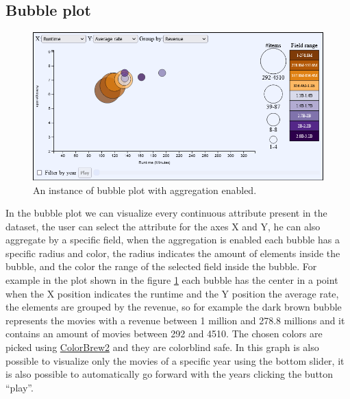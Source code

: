 \documentclass[]{article}
\newcommand{\quotes}[1]{``#1''}
\begin{document}
\subsection{Bubble plot}
\begin{figure}[H]
	\centering
	\includegraphics[width=1\linewidth]{images/bubble_plot}
	\caption[Bubble plot]{An instance of bubble plot with aggregation enabled.}
	\label{fig:bubbleplot}
\end{figure}
In the bubble plot we can visualize every continuous attribute present in the dataset, the user can select the attribute for the axes X and Y, he can also aggregate by a specific field, when the aggregation is enabled each bubble has a specific radius and color, the radius indicates the amount of elements inside the bubble, and the color the range of the selected field inside the bubble.
For example in the plot shown in the figure \ref{fig:bubbleplot} each bubble has the center in a point when the X position indicates the runtime and the Y position the average rate, the elements are grouped by the revenue, so for example the dark brown bubble represents the movies with a revenue between 1 million and 278.8 millions and it contains an amount of movies between 292 and 4510.\newline
The chosen colors are picked using \href{https://colorbrewer2.or}{ColorBrew2} and they are colorblind safe.\newline
In this graph is also possible to visualize only the movies of a specific year using the bottom slider, it is also possible to automatically go forward with the years clicking the button \quotes{play}.
\end{document}
